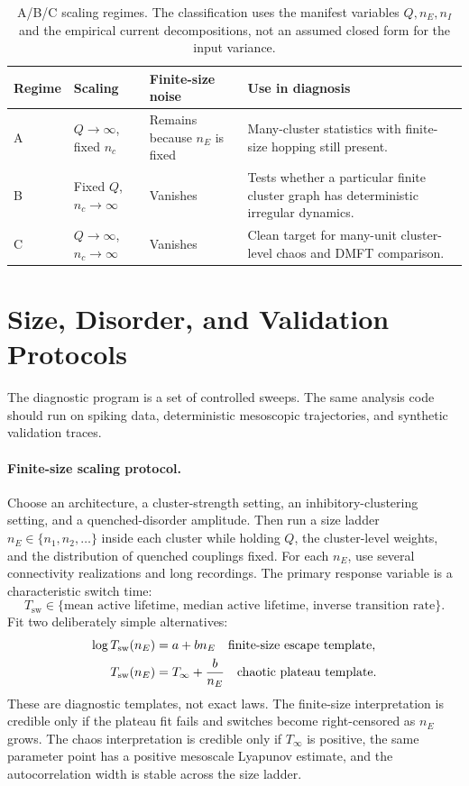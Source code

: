 \begin{table}[t]
\centering
\small
\begin{tabularx}{\textwidth}{@{}p{}p{}p{}X@{}}
\toprule
\textbf{Regime} & \textbf{Scaling} & \textbf{Finite-size noise} & \textbf{Use in diagnosis} \\
\midrule
A & \(Q\to\infty\), fixed \(n_c\) & Remains because \(n_E\) is fixed & Many-cluster statistics with finite-size hopping still present. \\
B & Fixed \(Q\), \(n_c\to\infty\) & Vanishes & Tests whether a particular finite cluster graph has deterministic irregular dynamics. \\
C & \(Q\to\infty\), \(n_c\to\infty\) & Vanishes & Clean target for many-unit cluster-level chaos and DMFT comparison. \\
\bottomrule
\end{tabularx}
\caption{A/B/C scaling regimes. The classification uses the manifest variables
\(Q,n_E,n_I\) and the empirical current decompositions, not an assumed closed
form for the input variance.}
\label{tab:ch09-abc-regimes}
\end{table}

\section{Size, Disorder, and Validation Protocols}
\label{sec:ch09-sweep-validation-protocols}

The diagnostic program is a set of controlled sweeps. The same analysis code
should run on spiking data, deterministic mesoscopic trajectories, and
synthetic validation traces.

\paragraph{Finite-size scaling protocol.}
Choose an architecture, a cluster-strength setting, an inhibitory-clustering
setting, and a quenched-disorder amplitude. Then run a size ladder
\(n_E\in\{n_1,n_2,\ldots\}\) inside each cluster while holding \(Q\), the
cluster-level weights, and the distribution of quenched couplings fixed. For
each \(n_E\), use several connectivity realizations and long recordings. The
primary response variable is a characteristic switch time:
\[
    T_{\mathrm{sw}}
    \in
    \{\text{mean active lifetime},\,
    \text{median active lifetime},\,
    \text{inverse transition rate}\}.
\]
Fit two deliberately simple alternatives:
\begin{align}
    \log T_{\mathrm{sw}}(n_E)
    &=
    a+b n_E
    \quad\text{finite-size escape template,}
    \notag\\
    T_{\mathrm{sw}}(n_E)
    &=
    T_\infty + \frac{b}{n_E}
    \quad\text{chaotic plateau template.}
    \label{eq:ch09-size-scaling-fits}
\end{align}
These are diagnostic templates, not exact laws. The finite-size interpretation
is credible only if the plateau fit fails and switches become right-censored
as \(n_E\) grows. The chaos interpretation is credible only if \(T_\infty\) is
positive, the same parameter point has a positive mesoscale Lyapunov estimate,
and the autocorrelation width is stable across the size ladder.

